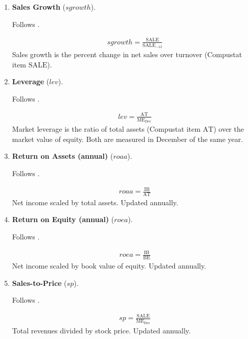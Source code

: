 \begin{enumerate}
	
	
	\item \textbf{Sales Growth} ($sgrowth$).
	
	Follows .
	
	\begin{align*}
		sgrowth = \frac{ \mathrm{SALE} }{ \mathrm{SALE}_{-12} }
	\end{align*}
	Sales growth is the percent change in net sales over turnover (Compustat item $\mathrm{SALE}$).
	
	
	
	\item \textbf{Leverage} ($lev$). 
	
	Follows . 
	
	\begin{align*}
		lev = \frac{ \mathrm{AT} }{ \mathrm{ME}_{\text{Dec}} }
	\end{align*}
	Market leverage is the ratio of total assets (Compustat item $\mathrm{AT}$) over the market value of equity. Both are measured in December of the same year.
	
	
	
	\item \textbf{Return on Assets (annual)} ($roaa$).
	
	Follows . 
	
	\begin{align*}
		roaa = \frac{ \mathrm{IB} }{ \mathrm{AT} }
	\end{align*}
	Net income scaled by total assets. Updated annually.
	
	
	
	\item \textbf{Return on Equity (annual)} ($roea$). 
	
	Follows . 
	
	\begin{align*}
		roea = \frac{ \mathrm{IB} }{ \mathrm{BE} }
	\end{align*}
	Net income scaled by book value of equity. Updated annually.
	
	
	
	\item \textbf{Sales-to-Price} ($sp$).
	
	
	Follows . 
	
	\begin{align*}
		sp =\frac{ \mathrm{SALE} }{ \mathrm{ME}_{\text{Dec}} }
	\end{align*}
	Total revenues divided by stock price. Updated annually.
	

\end{enumerate}
